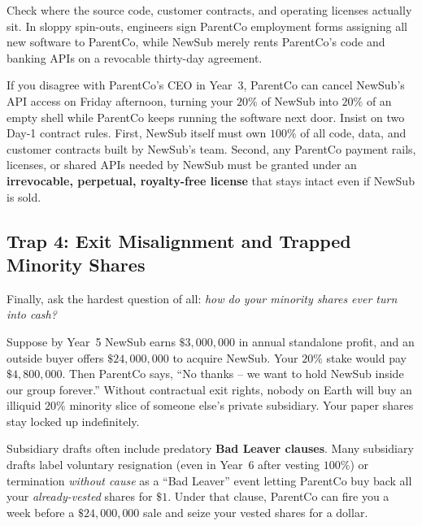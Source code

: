 Check where the source code, customer contracts, and operating licenses actually sit. In sloppy spin-outs, engineers sign ParentCo employment forms assigning all new software to ParentCo, while NewSub merely rents ParentCo's code and banking APIs on a revocable thirty-day agreement.

If you disagree with ParentCo's CEO in Year~3, ParentCo can cancel NewSub's API access on Friday afternoon, turning your $20\%$ of NewSub into $20\%$ of an empty shell while ParentCo keeps running the software next door. Insist on two Day-1 contract rules. First, NewSub itself must own $100\%$ of all code, data, and customer contracts built by NewSub's team. Second, any ParentCo payment rails, licenses, or shared APIs needed by NewSub must be granted under an \textbf{irrevocable, perpetual, royalty-free license} that stays intact even if NewSub is sold.

\subsection{Trap 4: Exit Misalignment and Trapped Minority Shares}
\label{subsec:good-leaver-bad-leaver}
\label{subsec:preemptive-tag-drag}

Finally, ask the hardest question of all: \emph{how do your minority shares ever turn into cash?}

Suppose by Year~5 NewSub earns $\$3{,}000{,}000$ in annual standalone profit, and an outside buyer offers $\$24{,}000{,}000$ to acquire NewSub. Your $20\%$ stake would pay $\$4{,}800{,}000$. Then ParentCo says, ``No thanks -- we want to hold NewSub inside our group forever.'' Without contractual exit rights, nobody on Earth will buy an illiquid $20\%$ minority slice of someone else's private subsidiary. Your paper shares stay locked up indefinitely.

Subsidiary drafts often include predatory \textbf{Bad Leaver clauses}. Many subsidiary drafts label voluntary resignation (even in Year~6 after vesting $100\%$) or termination \emph{without cause} as a ``Bad Leaver'' event letting ParentCo buy back all your \emph{already-vested} shares for $\$1$. Under that clause, ParentCo can fire you a week before a $\$24{,}000{,}000$ sale and seize your vested shares for a dollar.

